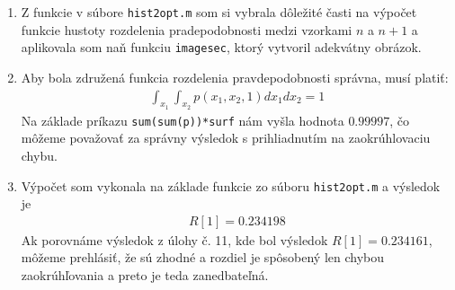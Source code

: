 \documentclass[10pt, a4paper, twocolumn]{article}
\begin{document}
\begin{enumerate}[leftmargin=*]
\item Z funkcie v súbore \texttt{hist2opt.m} som si vybrala dôležité časti na výpočet  funkcie hustoty rozdelenia pradepodobnosti medzi vzorkami $n$ a $n+1$ a aplikovala som naň funkciu \texttt{imagesec}, ktorý vytvoril adekvátny obrázok. 
\begin{figure}[H]
\centering
{}
\end{figure}

\item Aby bola združená funkcia rozdelenia pravdepodobnosti správna, musí platiť:
\begin{align}
\int_{x_1} \int_{x_2} p(x_1, x_2, 1) dx_1 dx_2 = 1 \nonumber
\end{align}
Na základe príkazu \texttt{sum(sum(p))*surf} nám vyšla hodnota $0.99997$, čo môžeme považovať za správny výsledok s prihliadnutím na zaokrúhlovaciu chybu.

\item Výpočet som vykonala na základe funkcie zo súboru \texttt{hist2opt.m} a výsledok je
\begin{align}
R[1] = 0.234198 \nonumber
\end{align}
Ak porovnáme výsledok z úlohy č. 11, kde bol výsledok $R[1]=0.234161$, môžeme prehlásiť, že sú zhodné a rozdiel je spôsobený len chybou zaokrúhľovania a preto je teda zanedbateľná.

\end{enumerate}
\end{document}

